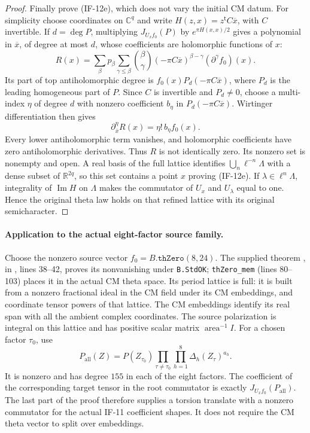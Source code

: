 \documentclass[11pt,a4paper]{article}
\theoremstyle{definition}
\theoremstyle{remark}
\begin{document}
\begin{proof}
Finally prove (IF-12e), which does not vary the initial CM datum.
For simplicity choose coordinates on $\mathbb C^q$ and write
$H(z,x)=z^{\mathsf t}C\overline x$, with $C$ invertible. If
$d=\deg P$, multiplying $J_{U_x f_0}(P)$ by
$e^{\pi H(x,x)/2}$ gives a polynomial in $\overline x$, of degree
at most $d$, whose coefficients are holomorphic functions of $x$:
\[
 R(x)=\sum_\beta p_\beta\sum_{\gamma\le\beta}
    {\beta\choose\gamma}(-\pi C\overline x)^{\beta-\gamma}
                                      (\partial^\gamma f_0)(x).
                                                               \tag{IF-12q}
\]
Its part of top antiholomorphic degree is
$f_0(x)P_d(-\pi C\overline x)$, where $P_d$ is the leading
homogeneous part of $P$. Since $C$ is invertible and $P_d\ne0$,
choose a multi-index $\eta$ of degree $d$ with nonzero coefficient
$b_\eta$ in $P_d(-\pi C\overline x)$. Wirtinger differentiation
then gives
\[
             \partial_{\overline x}^{\eta}R(x)
                        =\eta!\,b_\eta f_0(x).                \tag{IF-12r}
\]
Every lower antiholomorphic term vanishes, and holomorphic
coefficients have zero antiholomorphic derivatives. Thus $R$ is not
identically zero. Its nonzero set is nonempty and open. A real basis
of the full lattice identifies
$\bigcup_n\ell^{-n}\Lambda$ with a dense subset of
$\mathbb R^{2q}$, so this set contains a point $x$ proving
(IF-12e). If $\lambda\in\ell^n\Lambda$, integrality of
$\operatorname{Im}H$ on $\Lambda$ makes the commutator of
$U_x$ and $U_\lambda$ equal to one. Hence the original theta law
holds on that refined lattice with its original semicharacter.
\end{proof}

\paragraph{Application to the actual eight-factor source family.}
Choose the nonzero source vector
$f_0=B.\texttt{thZero}(8,24)$.
The supplied theorem , in
, lines 38--42, proves its
nonvanishing under \texttt{B.StdOK}; \texttt{thZero\_mem}
(lines 80--103) places it in the actual CM theta space. Its period
lattice is full: it is built from a nonzero fractional ideal in the
CM field under its CM embeddings, and coordinate tensor powers of
that lattice. The CM embeddings identify its real span with all the
ambient complex coordinates. The source polarization is integral on
this lattice and has positive scalar matrix $\operatorname{area}^{-1}I$.
For a chosen factor $\tau_0$, use
\[
 P_{\mathrm{all}}(Z)=P(Z_{\tau_0})
          \prod_{\tau\ne\tau_0}\prod_{h=1}^{8}
                         \Delta_h(Z_\tau)^{a_h}.               \tag{IF-12s}
\]
It is nonzero and has degree $155$ in each of the eight factors.
The coefficient of the corresponding target tensor in the root
commutator is exactly $J_{U_xf_0}(P_{\mathrm{all}})$.
The last part of the proof therefore supplies a torsion translate
with a nonzero commutator for the actual IF-11 coefficient shapes.
It does not require the CM theta vector to split over embeddings.
\end{document}
